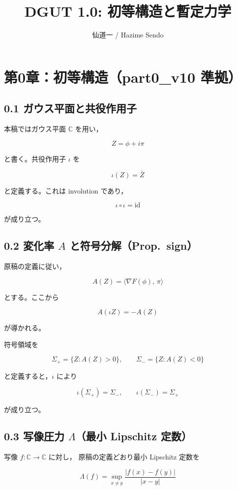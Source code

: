 \documentclass[12pt]{article}
\title{DGUT 1.0: 初等構造と暫定力学}
\author{仙道一 / Hazime Sendo}
\date{}
\begin{document}
\sloppy
\maketitle

\section*{第0章：初等構造（part0\_v10 準拠）}

\subsection*{0.1 ガウス平面と共役作用子}

本稿ではガウス平面 $\mathbb{C}$ を用い，


\[
Z = \phi + i\pi
\]


と書く。共役作用子 $\iota$ を


\[
\iota(Z) = \bar Z
\]


と定義する。これは involution であり，


\[
\iota\circ\iota = \mathrm{id}
\]


が成り立つ。

\subsection*{0.2 変化率 $A$ と符号分解（Prop.~sign）}

原稿の定義に従い，


\[
A(Z) = \langle \nabla F(\phi),\, \pi \rangle
\]


とする。ここから


\[
A(\iota Z) = -A(Z)
\]


が導かれる。

符号領域を


\[
\Sigma_+ = \{Z : A(Z) > 0\},\qquad
\Sigma_- = \{Z : A(Z) < 0\}
\]


と定義すると，$\iota$ により


\[
\iota(\Sigma_+) = \Sigma_-,\qquad
\iota(\Sigma_-) = \Sigma_+
\]


が成り立つ。

\subsection*{0.3 写像圧力 $\Lambda$（\textbf{最小 Lipschitz 定数}）}

写像 $f:\mathbb{C}\to\mathbb{C}$ に対し，
原稿の定義どおり最小 Lipschitz 定数を


\[
\Lambda(f)
= \sup_{x\neq y}\frac{|f(x)-f(y)|}{|x-y|}
\]
\end{document}
